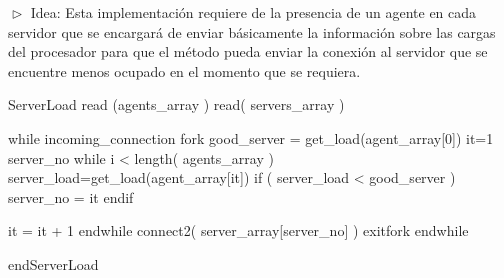 
$\vartriangleright$ Idea: Esta implementación requiere de la presencia de un agente en cada servidor que se encargará de enviar básicamente
la información sobre las cargas del procesador para que el método pueda enviar la conexión al servidor que se encuentre menos ocupado en el
momento que se requiera.

\begin{verbatimtab}[\myTabs]

ServerLoad
	read (agents_array )
	read( servers_array )
	
	while incoming_connection
		fork
			good_server = get_load(agent_array[0])
			it=1
			server_no
			while i < length( agents_array )
				server_load=get_load(agent_array[it])
				if ( server_load < good_server )
					server_no = it
				endif
			
			it = it + 1
			endwhile
			connect2( server_array[server_no] )
		exitfork
	endwhile
	
endServerLoad

\end{verbatimtab}